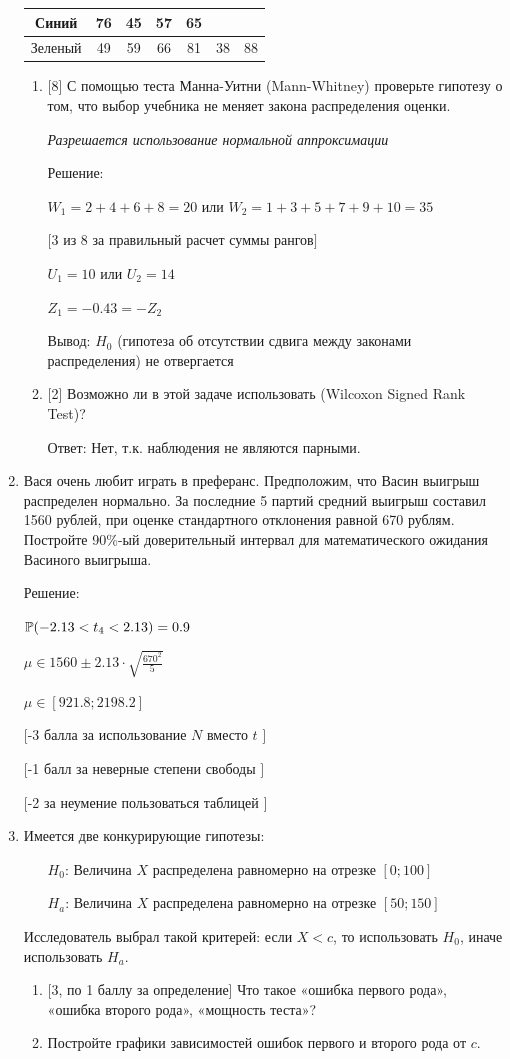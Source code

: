 \documentclass[12pt, a4paper]{article}\usepackage[]{graphicx}\usepackage[]{color}
\begin{document}
\begin{enumerate}
\begin{tabular}{|c|c|c|c|c|c|c|}
  \hline
  Синий & 76 & 45 & 57 & 65 &  &  \\
  \hline
  Зеленый & 49 & 59 & 66 & 81 & 38 & 88 \\
  \hline
\end{tabular}
\begin{enumerate}
\item{} [8] С помощью теста Манна-Уитни (Mann-Whitney) проверьте
гипотезу о том, что выбор учебника не меняет закона распределения оценки.

\emph{Разрешается использование нормальной аппроксимации}

Решение:

$W_{1}=2+4+6+8=20$ или $W_{2}=1+3+5+7+9+10=35$

$[$3 из 8 за правильный расчет суммы рангов$]$

$U_{1}=10$ или $U_{2}=14$

$Z_{1}=-0.43=-Z_{2}$

Вывод: $H_{0}$ (гипотеза об отсутствии сдвига между законами
распределения) не отвергается
\item{} [2] Возможно ли в этой задаче использовать (Wilcoxon Signed Rank Test)?

Ответ: Нет, т.к. наблюдения не являются парными.
\end{enumerate}

\item Вася очень любит играть в преферанс. Предположим, что Васин
выигрыш распределен нормально. За последние 5 партий средний
выигрыш составил 1560 рублей, при оценке стандартного отклонения
равной 670 рублям. Постройте 90\%-ый доверительный интервал для
математического ожидания Васиного выигрыша.

Решение:

$\P(-2.13<t_{4}<2.13)=0.9$

$\mu \in 1560 \pm 2.13\cdot \sqrt{\frac{670^{2}}{5}}$

$\mu \in [921.8;2198.2]$

$[$-3 балла за использование $N$ вместо $t$ $]$

$[$-1 балл за неверные степени свободы $]$

$[$-2 за неумение пользоваться таблицей $]$

\item Имеется две конкурирующие гипотезы:
\begin{enumerate}
\item[$H_{0}$:] Величина $X$ распределена равномерно на отрезке $[0;100]$
\item[$H_{a}$:] Величина $X$ распределена равномерно на отрезке $[50;150]$
\end{enumerate}
Исследователь выбрал такой критерей: если $X<c$, то использовать $H_{0}$, иначе использовать $H_{a}$.
\begin{enumerate}
\item{} [3, по 1 баллу за определение] Что такое «ошибка первого
рода», «ошибка второго рода»,
«мощность теста»?
\item Постройте графики зависимостей ошибок первого и второго рода от
$c$.


\end{enumerate}
\end{enumerate}
\end{document}

